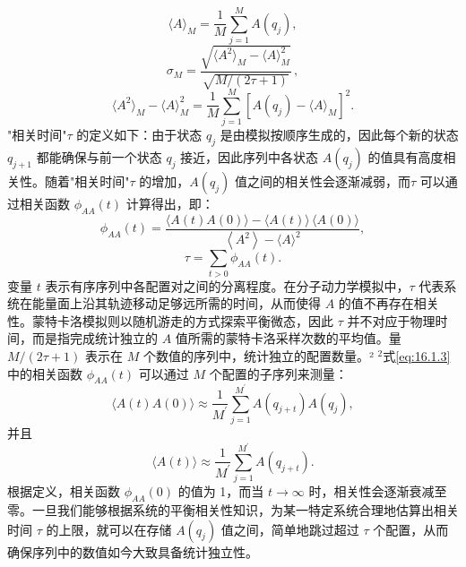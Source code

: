 \begin{equation}\tag{16.1.2}\label{eq:16.1.2}
\langle A \rangle _ { M } = \frac { 1 } { M } \sum _ { j = 1 } ^{M} A ( q _ { j } ) ,
\end{equation}
\begin{equation}\tag{16.1.3}\label{eq:16.1.3}
\sigma _ { M } = \frac { \sqrt { \langle A ^{2} \rangle _ { M } - \langle A \rangle _ { M } ^{2} } } { \sqrt { M / ( 2 \tau + 1 ) } } \, ,
\end{equation}
\begin{equation}\tag{16.1.4}\label{eq:16.1.4}
\langle A ^{2} \rangle _ { M } - \langle A \rangle _ { M } ^{2} = \frac { 1 } { M } \sum _ { j = 1 } ^{M} [ A ( q _ { j } ) - \langle A \rangle _ { M } ] ^{2} .
\end{equation}
"相关时间"\(\tau\) 的定义如下：由于状态 \(q_j\) 是由模拟按顺序生成的，因此每个新的状态 \(q_{j+1}\) 都能确保与前一个状态 \(q_j\) 接近，因此序列中各状态 \(A(q_j)\) 的值具有高度相关性。随着"相关时间"\(\tau\) 的增加，\(A(q_j)\) 值之间的相关性会逐渐减弱，而\(\tau\) 可以通过相关函数 \(\phi_{AA}(t)\) 计算得出，即：
\begin{equation}\tag{16.1.5}\label{eq:16.1.5}
\phi _ { A A } ( t ) = \frac { \langle A ( t ) A ( 0 ) \rangle - \langle A ( t ) \rangle \, \langle A ( 0 ) \rangle } { \left\langle A ^{2} \right\rangle - \langle A \rangle ^{2} } ,
\end{equation}
\begin{equation}\tag{16.1.6}\label{eq:16.1.6}
\tau = \sum _ { t > 0 } \phi _ { A A } ( t ) .
\end{equation}
变量 \(t\) 表示有序序列中各配置对之间的分离程度。在分子动力学模拟中，\(\tau\) 代表系统在能量面上沿其轨迹移动足够远所需的时间，从而使得 \(A\) 的值不再存在相关性。蒙特卡洛模拟则以随机游走的方式探索平衡微态，因此 \(\tau\) 并不对应于物理时间，而是指完成统计独立的 \(A\) 值所需的蒙特卡洛采样次数的平均值。量 \(M/(2\tau + 1)\) 表示在 \(M\) 个数值的序列中，统计独立的配置数量。²
\(^{2}\)式\autoref{eq:16.1.3} 中的相关函数 \(\phi_{AA}(t)\) 可以通过 \(M\) 个配置的子序列来测量：
\begin{equation}\tag{16.1.7}\label{eq:16.1.7}
\langle A ( t ) A ( 0 ) \rangle \approx \frac { 1 } { M ^{\prime} } \sum _ { j = 1 } ^{M ^ { \prime} } A ( q _ { j + t } ) A ( q _ { j } ) ,
\end{equation}
并且
\begin{equation}\tag{16.1.8}\label{eq:16.1.8}
\langle A ( t ) \rangle \approx \frac { 1 } { M ^{\prime} } \sum _ { j = 1 } ^{M ^ { \prime} } A ( q _ { j + t } ) .
\end{equation}
根据定义，相关函数 \(\phi_{AA}(0)\) 的值为 1，而当 \(t \to \infty\) 时，相关性会逐渐衰减至零。一旦我们能够根据系统的平衡相关性知识，为某一特定系统合理地估算出相关时间 \(\tau\) 的上限，就可以在存储 \(A(q_j)\) 值之间，简单地跳过超过 \(\tau\) 个配置，从而确保序列中的数值如今大致具备统计独立性。
